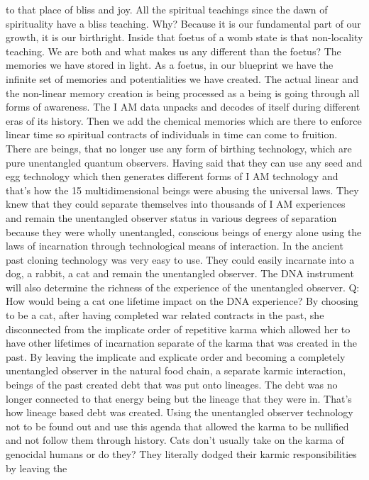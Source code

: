 to that place of bliss and joy. All the spiritual teachings since the
dawn of spirituality have a bliss teaching. Why? Because it is our
fundamental part of our growth, it is our birthright. Inside that foetus
of a womb state is that non-locality teaching. We are both and what
makes us any different than the foetus? The memories we have stored in
light. As a foetus, in our blueprint we have the infinite set of
memories and potentialities we have created. The actual linear and the
non-linear memory creation is being processed as a being is going
through all forms of awareness. The I AM data unpacks and decodes of
itself during different eras of its history. Then we add the chemical
memories which are there to enforce linear time so spiritual contracts
of individuals in time can come to fruition. There are beings, that no
longer use any form of birthing technology, which are pure unentangled
quantum observers. Having said that they can use any seed and egg
technology which then generates different forms of I AM technology and
that's how the 15 multidimensional beings were abusing the universal
laws. They knew that they could separate themselves into thousands of I
AM experiences and remain the unentangled observer status in various
degrees of separation because they were wholly unentangled, conscious
beings of energy alone using the laws of incarnation through
technological means of interaction. In the ancient past cloning
technology was very easy to use. They could easily incarnate into a dog,
a rabbit, a cat and remain the unentangled observer. The DNA instrument
will also determine the richness of the experience of the unentangled
observer. Q: How would being a cat one lifetime impact on the DNA
experience? By choosing to be a cat, after having completed war related
contracts in the past, she disconnected from the implicate order of
repetitive karma which allowed her to have other lifetimes of
incarnation separate of the karma that was created in the past. By
leaving the implicate and explicate order and becoming a completely
unentangled observer in the natural food chain, a separate karmic
interaction, beings of the past created debt that was put onto lineages.
The debt was no longer connected to that energy being but the lineage
that they were in. That's how lineage based debt was created. Using the
unentangled observer technology not to be found out and use this agenda
that allowed the karma to be nullified and not follow them through
history. Cats don't usually take on the karma of genocidal humans or do
they? They literally dodged their karmic responsibilities by leaving the
